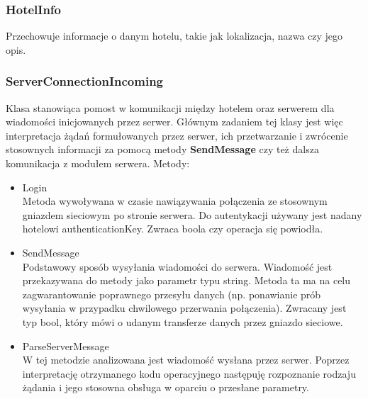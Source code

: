\documentclass{article}
\begin{document}
\subsubsection{HotelInfo}\label{HotelInfo}
Przechowuje informacje o danym hotelu, takie jak lokalizacja, nazwa czy jego opis.

\subsubsection{ServerConnectionIncoming}
Klasa stanowiąca pomost w komunikacji między hotelem oraz serwerem dla wiadomości inicjowanych przez serwer. Głównym zadaniem tej klasy jest więc interpretacja żądań formułowanych przez serwer, ich przetwarzanie i zwrócenie stosownych informacji za pomocą metody \textbf{SendMessage} czy też dalsza komunikacja z modułem serwera. 
Metody:
\begin{itemize}
    \item Login\\
    Metoda wywoływana w czasie nawiązywania połączenia ze stosownym gniazdem sieciowym po stronie serwera. Do autentykacji używany jest nadany hotelowi authenticationKey. 
    Zwraca boola czy operacja się powiodła.
    \item SendMessage\\
    Podstawowy sposób wysyłania wiadomości do serwera. Wiadomość jest przekazywana do metody jako parametr typu string. Metoda ta ma na celu zagwarantowanie poprawnego przesyłu danych (np. ponawianie prób wysyłania w przypadku chwilowego przerwania połączenia). Zwracany jest typ bool, który mówi o udanym transferze danych przez gniazdo sieciowe.
    \item ParseServerMessage\\
    W tej metodzie analizowana jest wiadomość wysłana przez serwer. Poprzez interpretację  otrzymanego kodu operacyjnego następuję rozpoznanie rodzaju żądania i jego stosowna obsługa w oparciu o przesłane parametry.  
\end{itemize}
\end{document}
